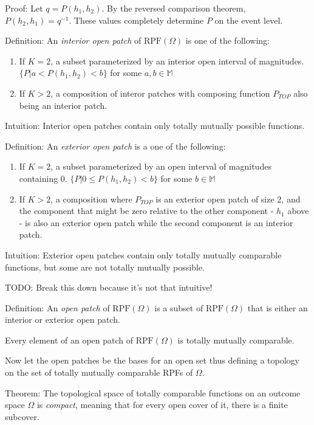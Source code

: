 \documentclass[twoside]{article}
\begin{document}
Proof: Let \(q = P(h_1, h_2)\). By the reversed comparison theorem, \(P(h_2, h_1) = q^{-1}\). These values completely determine \(P\) on the event level.

Definition: An \textit{interior open patch} of \(\text{RPF}(\Omega)\) is one of the following:

\begin{enumerate}
  \item If \(K = 2\), a subset parameterized by an interior open interval of magnitudes. \(\{P | a < P(h_1, h_2) < b\}\) for some \(a, b \in \mathbb{M}\) 
  \item If \(K > 2\), a composition of interor patches with composing function \(P_{TOP}\) also being an interior patch.
\end{enumerate}

Intuition: Interior open patches contain only totally mutually possible functions.

Definition: An \textit{exterior open patch} is a one of the following:

\begin{enumerate}
  \item If \(K = 2\), a subset parameterized by an open interval of magnitudes containing 0. \(\{P | 0 \leq P(h_1, h_2) < b\}\) for some \(b \in \mathbb{M}\) 
  \item If \(K > 2\), a composition where \(P_{TOP}\) is an exterior open patch of size 2, and the component that might be zero relative to the other component - \(h_1\) above - is also an exterior open patch while the second component is an interior patch.
\end{enumerate}

Intuition: Exterior open patches contain only totally mutually comparable functions, but some are not totally mutually possible.

TODO: Break this down because it's not that intuitive!

Definition: An \textit{open patch} of \(\text{RPF}(\Omega)\) is a subset of \(\text{RPF}(\Omega)\) that is either an interior or exterior open patch.

Every element of an open patch of \(\text{RPF}(\Omega)\) is totally mutually comparable.

Now let the open patches be the bases for an open set thus defining a topology on the set of totally mutually comparable RPFs of \(\Omega\).

Theorem: The topological space of totally comparable functions on an outcome space \(\Omega\) is \textit{compact}, meaning that for every open cover of it, there is a finite subcover.
\end{document}
